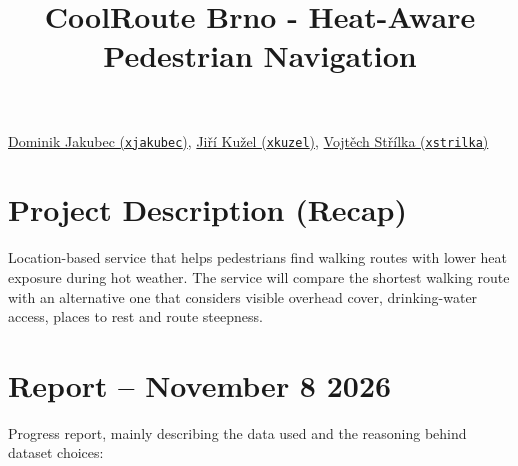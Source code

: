 \documentclass[11pt,a4paper]{article}
\title{CoolRoute Brno - Heat-Aware Pedestrian Navigation}
\author{}
\date{}
\makeatletter
\renewcommand{\maketitle}{%
  \begin{center}
    {\LARGE \@title\par}
  \end{center}
}
\makeatother
\begin{document}
\maketitle

\begin{center}
  \href{https://is.mendelu.cz/auth/lide/clovek.pl?id=100907;}
  {Dominik Jakubec (\texttt{xjakubec})},
  \href{https://is.mendelu.cz/auth/lide/clovek.pl?id=100910;}
  {Jiří Kužel (\texttt{xkuzel})},
  \href{https://is.mendelu.cz/auth/lide/clovek.pl?id=100912;}
  {Vojtěch Střílka (\texttt{xstrilka})}
\end{center}

\section{Project Description (Recap)}\label{project-description}

Location-based service that helps pedestrians find walking routes with lower
heat exposure during hot weather. The service will compare the shortest
walking route with an alternative one that considers visible overhead cover,
drinking-water access, places to rest and route steepness.

\section{Report -- November 8 2026}

Progress report, mainly describing the data used and the reasoning behind
dataset choices:
\end{document}
